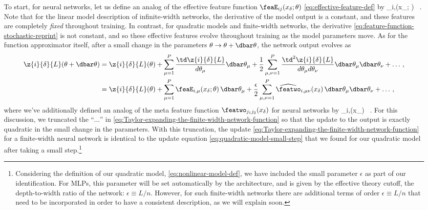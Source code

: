 To start, for neural networks, let us define an analog of the effective feature function $\feaE_{ij}(x_{\delta};\theta)$ \eqref{eq:effective-feature-def} by
\be\label{eq:feature-function-stochastic-reprint}
 \feaE_{i,\mu}(x_{\delta}; \theta) \equiv {}  \, .
\ee
Note that for the linear model description of infinite-width networks, the derivative of the model output is a constant, and these features are completely \emph{fixed} throughout training.
In contrast, for quadratic models and finite-width networks, the derivative \eqref{eq:feature-function-stochastic-reprint} is not constant, and so these effective features evolve throughout training as the model parameters move.
As for the function approximator itself, after a small change in the parameters $\theta \to \theta+\dbar\theta$, the network output evolves as 
\begin{align}\label{eq:Taylor-expanding-the-finite-width-network-function}
\z{i}{\delta}{L}(\theta+\dbar\theta)&=\z{i}{\delta}{L}(\theta)+\sum_{\mu=1}^{P} \frac{\td \z{i}{\delta}{L}}{d \theta_\mu} \dbar \theta_{\mu}+\frac{1}{2}\sum_{\mu,\nu=1}^{P} \frac{\td^2 \z{i}{\delta}{L}}{d \theta_\mu d \theta_\nu}\dbar \theta_{\mu}\dbar \theta_{\nu}+\ldots\, ,  \notag \\
&=\z{i}{\delta}{L}(\theta)+\sum_{\mu=1}^{P} \feaE_{i,\mu}(x_{\delta}; \theta)\,\dbar \theta_{\mu}+\frac{\epsilon}{2}\sum_{\mu,\nu=1}^{P} \widehat{\featwo}_{i,\mu\nu}(x_{\delta})\, \dbar \theta_{\mu}\dbar \theta_{\nu}+\ldots\, ,
\end{align}
where we've additionally defined an analog of the meta feature function $ \featwo_{j_1j_2}(x_{\delta})$ for neural networks by
\be\label{eq:nonlinear-feature-function-stochastic}
 \epsilon\widehat{\featwo}_{i,\mu\nu}(x_{\delta}) \equiv {}  \, .
\ee
For this discussion, we truncated the ``$\ldots$'' in \eqref{eq:Taylor-expanding-the-finite-width-network-function} so that the update to the output is exactly quadratic in the small change in the parameters. With this truncation, the update \eqref{eq:Taylor-expanding-the-finite-width-network-function} for a finite-width neural network is identical to the update equation \eqref{eq:quadratic-model-small-step} that we found for our quadratic model after taking a small step.\footnote{Considering the definition of our quadratic model, \eqref{eq:nonlinear-model-def},  we have included the small parameter $\epsilon$ as part of our identification. For MLPs, this parameter will be set automatically by the architecture, and is given by the effective theory cutoff, the depth-to-width ratio of the network: $\epsilon \equiv L/n$. However, for such finite-width networks there are additional terms of order $\epsilon \equiv L/n$ that need to be incorporated in order to have a consistent description, as we will explain soon.}


